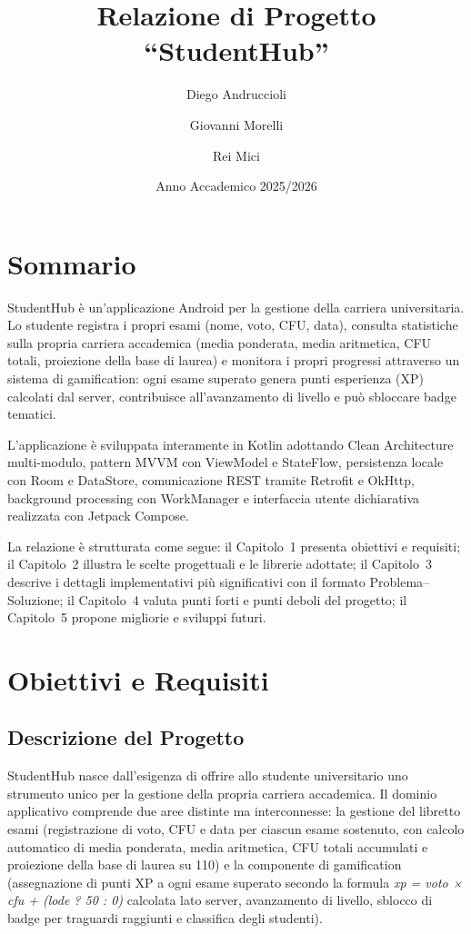 \documentclass[a4paper,12pt]{report}
\title{\textbf{Relazione di Progetto \\ ``StudentHub''}}
\author{Diego Andruccioli \and Giovanni Morelli \and Rei Mici}
\date{Anno Accademico 2025/2026}
\begin{document}
    \maketitle

    \chapter*{Sommario}

    StudentHub è un'applicazione Android per la gestione della carriera universitaria.
    Lo studente registra i propri esami (nome, voto, CFU, data), consulta statistiche
    sulla propria carriera accademica (media ponderata, media aritmetica, CFU totali,
    proiezione della base di laurea) e monitora i propri progressi attraverso un sistema
    di gamification: ogni esame superato genera punti esperienza (XP) calcolati dal server,
    contribuisce all'avanzamento di livello e può sbloccare badge tematici.

    L'applicazione è sviluppata interamente in Kotlin adottando Clean Architecture
    multi-modulo, pattern MVVM con ViewModel e StateFlow, persistenza locale con
    Room e DataStore, comunicazione REST tramite Retrofit e OkHttp, background
    processing con WorkManager e interfaccia utente dichiarativa realizzata con Jetpack Compose.

    La relazione è strutturata come segue: il Capitolo~1 presenta obiettivi e requisiti;
    il Capitolo~2 illustra le scelte progettuali e le librerie adottate; il Capitolo~3
    descrive i dettagli implementativi più significativi con il formato
    Problema--Soluzione; il Capitolo~4 valuta punti forti e punti deboli del progetto;
    il Capitolo~5 propone migliorie e sviluppi futuri.

    \tableofcontents

    \chapter{Obiettivi e Requisiti}

    \section{Descrizione del Progetto}

    StudentHub nasce dall'esigenza di offrire allo studente universitario uno strumento
    unico per la gestione della propria carriera accademica. Il dominio applicativo
    comprende due aree distinte ma interconnesse: la gestione del libretto esami
    (registrazione di voto, CFU e data per ciascun esame sostenuto, con calcolo automatico
    di media ponderata, media aritmetica, CFU totali accumulati e proiezione della base
    di laurea su 110) e la componente di gamification (assegnazione di punti XP a ogni
    esame superato secondo la formula \textit{xp = voto × cfu + (lode ? 50 : 0)}
    calcolata lato server, avanzamento di livello, sblocco di badge per traguardi raggiunti
    e classifica degli studenti).
\end{document}
